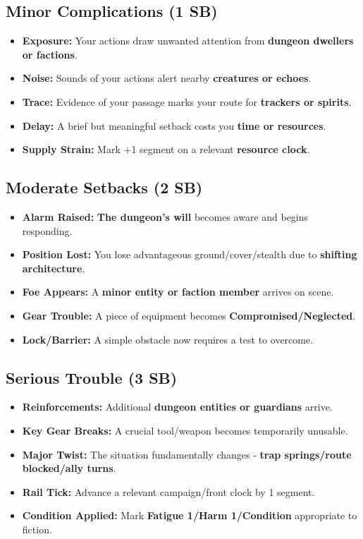 \subsection*{Minor Complications (1 SB)}
\begin{itemize}
\item \textbf{Exposure:} Your actions draw unwanted attention from \textbf{dungeon dwellers or factions}.
\item \textbf{Noise:} Sounds of your actions alert nearby \textbf{creatures or echoes}.
\item \textbf{Trace:} Evidence of your passage marks your route for \textbf{trackers or spirits}.
\item \textbf{Delay:} A brief but meaningful setback costs you \textbf{time or resources}.
\item \textbf{Supply Strain:} Mark +1 segment on a relevant \textbf{resource clock}.
\end{itemize}

\subsection*{Moderate Setbacks (2 SB)}
\begin{itemize}
\item \textbf{Alarm Raised:} \textbf{The dungeon's will} becomes aware and begins responding.
\item \textbf{Position Lost:} You lose advantageous ground/cover/stealth due to \textbf{shifting architecture}.
\item \textbf{Foe Appears:} A \textbf{minor entity or faction member} arrives on scene.
\item \textbf{Gear Trouble:} A piece of equipment becomes \textbf{Compromised/Neglected}.
\item \textbf{Lock/Barrier:} A simple obstacle now requires a test to overcome.
\end{itemize}

\subsection*{Serious Trouble (3 SB)}
\begin{itemize}
\item \textbf{Reinforcements:} Additional \textbf{dungeon entities or guardians} arrive.
\item \textbf{Key Gear Breaks:} A crucial tool/weapon becomes temporarily unusable.
\item \textbf{Major Twist:} The situation fundamentally changes - \textbf{trap springs/route blocked/ally turns}.
\item \textbf{Rail Tick:} Advance a relevant campaign/front clock by 1 segment.
\item \textbf{Condition Applied:} Mark \textbf{Fatigue 1/Harm 1/Condition} appropriate to fiction.
\end{itemize}


